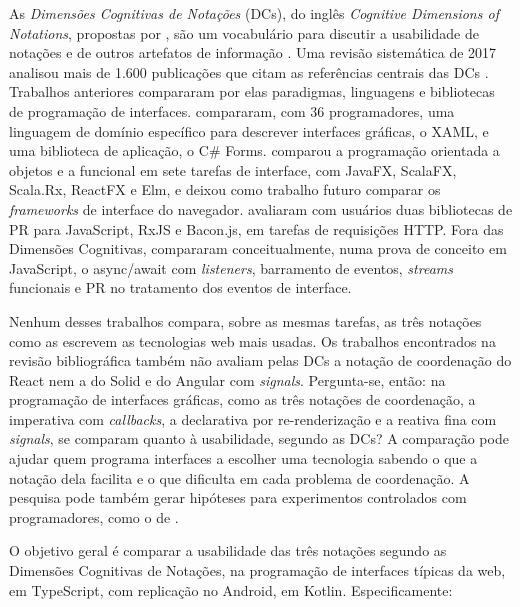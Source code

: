 As \emph{Dimensões Cognitivas de Notações} (DCs), do inglês \emph{Cognitive
Dimensions of Notations}, propostas por \textcite{green1989}, são um
vocabulário para discutir a usabilidade de notações e de outros
artefatos de informação \cite[p. 326]{blackwell2001}.
Uma revisão sistemática de 2017 analisou mais de 1.600 publicações que
citam as referências centrais das DCs \cite{hadhrawi2017}.
Trabalhos anteriores compararam por elas paradigmas, linguagens e
bibliotecas de programação de interfaces.
\textcite{mernik2009} compararam, com 36 programadores, uma linguagem de
domínio específico para descrever interfaces gráficas, o XAML, e uma
biblioteca de aplicação, o C\# Forms.
\textcite[p. v e 104]{kiss2014} comparou a programação orientada a
objetos e a funcional em sete tarefas de interface, com JavaFX, ScalaFX,
Scala.Rx, ReactFX e Elm, e deixou como trabalho futuro comparar os
\emph{frameworks} de interface do navegador.
\textcite[p. 1510 e 1513]{zimmerle2025} avaliaram com usuários duas
bibliotecas de PR para JavaScript, RxJS e Bacon.js, em tarefas de
requisições HTTP.
Fora das Dimensões Cognitivas, \textcite[p. 15]{grolaux2026} compararam
conceitualmente, numa prova de conceito em JavaScript, o async/await com
\emph{listeners}, barramento de eventos, \emph{streams} funcionais e PR no tratamento
dos eventos de interface.

Nenhum desses trabalhos compara, sobre as mesmas tarefas, as três notações
como as escrevem as tecnologias web mais usadas.
Os trabalhos encontrados na revisão bibliográfica também não avaliam pelas
DCs a notação de coordenação do React nem a do Solid e do Angular com
\emph{signals}.
Pergunta-se, então: na programação de interfaces gráficas, como as três
notações de coordenação, a imperativa com \emph{callbacks}, a declarativa por
re-renderização e a reativa fina com \emph{signals}, se comparam quanto à
usabilidade, segundo as DCs?
A comparação pode ajudar quem programa interfaces a escolher uma tecnologia
sabendo o que a notação dela facilita e o que dificulta em cada problema de
coordenação.
A pesquisa pode também gerar hipóteses para experimentos controlados com
programadores, como o de \textcite{salvaneschi2017}.

O objetivo geral é comparar a usabilidade das três notações segundo as
Dimensões Cognitivas de Notações, na programação de interfaces típicas da
web, em TypeScript, com replicação no Android, em Kotlin. Especificamente:

